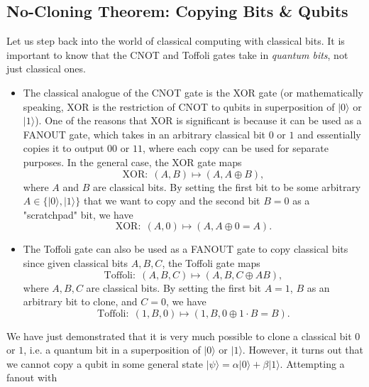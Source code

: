 \documentclass{article}
\theoremstyle{definition}
\begin{document}
\subsection*{No-Cloning Theorem: Copying Bits \& Qubits}
Let us step back into the world of classical computing with classical bits. It is important to know that the CNOT and Toffoli gates take in \textit{quantum bits}, not just classical ones.
\begin{itemize}
  \item The classical analogue of the CNOT gate is the XOR gate (or mathematically speaking, XOR is the restriction of CNOT to qubits in superposition of $|0\rangle$ or $|1\rangle$). One of the reasons that XOR is significant is because it can be used as a FANOUT gate, which takes in an arbitrary classical bit $0$ or $1$ and essentially copies it to output $00$ or $11$, where each copy can be used for separate purposes. In the general case, the XOR gate maps
    \[\text{XOR}: \; (A, B) \mapsto (A, A \oplus B),\]
    where $A$ and $B$ are classical bits. By setting the first bit to be some arbitrary $A \in \{|0\rangle, |1\rangle\}$ that we want to copy and the second bit $B = 0$ as a "scratchpad" bit, we have 
    \[\text{XOR}: \; (A, 0) \mapsto (A, A \oplus 0 = A).\]
  \item The Toffoli gate can also be used as a FANOUT gate to copy classical bits since given classical bits $A, B, C$, the Toffoli gate maps 
    \[\text{Toffoli}: \; (A, B, C) \mapsto (A, B, C \oplus A B),\]
    where $A, B, C$ are classical bits. By setting the first bit $A = 1$, $B$ as an arbitrary bit to clone, and $C=0$, we have 
    \[\text{Toffoli}: \; (1, B, 0) \mapsto (1, B, 0 \oplus 1\cdot B = B).\]
\end{itemize}
We have just demonstrated that it is very much possible to clone a classical bit $0$ or $1$, i.e. a quantum bit in a superposition of $|0\rangle$ or $|1\rangle$. However, it turns out that we cannot copy a qubit in some general state $|\psi\rangle = \alpha |0\rangle + \beta |1\rangle$. Attempting a fanout with
\end{document}
